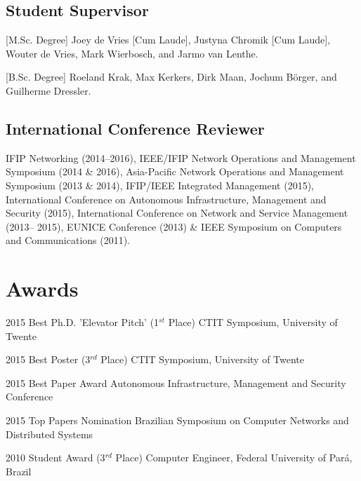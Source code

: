 \documentclass[print]{friggeri-cv} %
\begin{document}
\subsection{Student Supervisor}

\begin{entrylist}
\vspace{-0.3cm}
\entry
{[M.Sc. Degree]}
{Joey de Vries [Cum Laude], Justyna Chromik [Cum Laude], Wouter de Vries, Mark Wierbosch, and Jarmo van Lenthe.}
{}

\vspace{-0.3cm}
\entry
{[B.Sc. Degree]}
{Roeland Krak, Max Kerkers, Dirk Maan, Jochum Börger, and Guilherme Dressler.}
{}



\end{entrylist}

\subsection{International Conference Reviewer}
IFIP Networking (2014--2016), IEEE/IFIP Network Operations and Management Symposium (2014 \& 2016), Asia-Pacific Network Operations and Management Symposium (2013 \& 2014), IFIP/IEEE Integrated Management (2015), International Conference on Autonomous Infrastructure, Management and Security (2015), International Conference on Network and Service Management (2013-- 2015), EUNICE Conference (2013) \& IEEE Symposium on Computers and Communications (2011).\\


\section{Awards}

\begin{entrylist}
\vspace{-0.3cm}
\entry
{2015}
{Best Ph.D. 'Elevator Pitch' (1$^{st}$ Place)}
{CTIT Symposium, University of Twente}

\vspace{-0.3cm}
\entry
{2015}
{Best Poster (3$^{rd}$ Place)}
{CTIT Symposium, University of Twente}

\vspace{-0.3cm}
\entry
{2015}
{Best Paper Award}
{Autonomous Infrastructure, Management and Security Conference}

\vspace{-0.3cm}
\entry
{2015}
{Top Papers Nomination}
{Brazilian Symposium on Computer Networks and Distributed Systems}

\vspace{-0.3cm}
\entry
{2010}
{Student Award (3$^{rd}$ Place)}
{Computer Engineer, Federal University of Pará, Brazil}

\end{entrylist}
\end{document}
